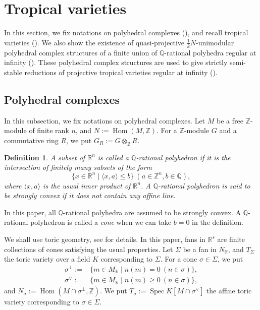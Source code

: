 \documentclass[12pt,a4]{amsart}
\newtheorem{dfn}[thm]{Definition}
\def\R{\mathbb{R}}
\def\Z{\mathbb{Z}}
\def\Q{\mathbb{Q}}
\def\Spec{\mathop{\mathrm{Spec}}\nolimits}
\def\Hom{\mathop{\mathrm{Hom}}\nolimits}
\numberwithin{equation}{section}
\numberwithin{figure}{section}
\begin{document}
\section{Tropical varieties}\label{sec tropical varieties}
  In this section,
    we fix notations on polyhedral complexes
     (), 
    and 
    recall tropical varieties (). 
  We also show 
   the existence of 
    quasi-projective $\frac{1}{k}N$-unimodular polyhedral complex structures of  
    a finite union of 
    $\Q$-rational polyhedra regular at infinity (). 
  These polyhedral complex structures are used to give 
  strictly semi-stable reductions of projective tropical varieties 
  regular at infinity ().



 \subsection{Polyhedral complexes} \label{subsec:polyhedral complexes}
   In this subsection,  we fix notations on polyhedral complexes.
  Let
  $M $ be a free $\Z$-module of finite rank $n$,
  and $N:=\Hom(M,\Z)$.
   For a $\Z$-module $G$ and  a commutative ring $R$, we put $G_R := G \otimes_\Z R$.

    \begin{dfn}
    A subset of $\R^n$ is called a \emph{$\Q$-rational polyhedron}
    if  it is the intersection of finitely many subsets of the form
    $$\{x \in \R^n \mid \langle x , a \rangle \leq b \} \ (a \in \Z^n, b \in  \Q),$$
    where $\langle x,a\rangle$ is the usual inner product of $\R^n$.
    A $\Q$-rational polyhedron is said to be 
    \emph{strongly convex} 
    if it does not contain any affine line.
    \end{dfn}

    In this paper, all $\Q$-rational polyhedra 
      are assumed to be strongly convex. 
     A $\Q$-rational polyhedron is called a \emph{cone} when we can take $b=0$ in the definition. 

   We shall use toric geometry, see 
   \cite{CoxaLittleSchenckToricvarieties2011} for details.
  In this paper, fans in $\R^s$ are finite collections of cones satisfying the usual properties.
  Let $\Sigma$ be a fan in $N_\R$, and $T_{\Sigma}$ the toric variety over a field $K$ corresponding to $\Sigma$. 
  For a cone $\sigma \in \Sigma$,
  we put 
  \begin{align*}
  \sigma^{\perp}:= & \{m\in M_\R \mid n(m)=0 \ (n\in \sigma) \}, \\
  \sigma^{\vee}:= &\{m\in M_\R \mid n(m ) \geq 0 \ (n\in \sigma) \}, 
  \end{align*}
  and 
  $N_{\sigma}:= \Hom (M  \cap \sigma^{\perp} , \Z)$.
  We put $T_{\sigma}:= \Spec K[M \cap \sigma^{\vee}]$ the affine toric variety corresponding to  
  $\sigma\in\Sigma$.
  
\end{document}
